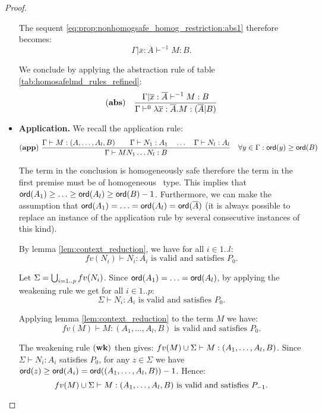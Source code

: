 \begin{proof}
\begin{itemize}
The sequent \ref{eq:prop:nonhomogsafe_homog_restriction:abs1} therefore becomes:
$$\Gamma | \overline{x} : \overline{A} \vdash^{-1} M : B.$$

We conclude by applying the abstraction rule of table
\ref{tab:homosafelmd_rules_refined}:
$$ \mathbf{(abs)} \quad  \frac{\displaystyle \Gamma| \overline{x} : \overline{A} \vdash^{-1} M : B}{\Gamma  \vdash^{0} \lambda \overline{x} : \overline{A} . M : (\overline{A}|B)}$$



\item \textbf{Application.} We recall the application rule:
$$ \mathbf{(app)} \  \frac{\displaystyle \Gamma \vdash M : (A,\ldots,A_l,B)
                                        \qquad \Gamma \vdash N_1 : A_1
                                        \quad \ldots \quad \Gamma \vdash N_l : A_l  }{\Gamma  \vdash M N_1 \ldots N_l : B}
                                    \quad
                                   \forall y \in \Gamma : {\sf ord}(y) \geq {\sf ord}(B)$$

The term in the conclusion is homogeneously safe therefore the term in the first premise must be of homogeneous \
type. This implies that ${\sf ord}(A_1) \geq \ldots \geq {\sf ord}(A_l)
\geq {\sf ord}(B) - 1$.
Furthermore, we can make the assumption that ${\sf ord}(A_1) = \ldots = {\sf ord}(A_l) = {\sf ord}(\overline{A})$
(it is always possible to replace an instance of the application rule
by several consecutive instances of this kind).

By lemma \ref{lem:context_reduction}, we have for all $i \in 1..l$:
$$fv(N_i) \vdash N_i : A_i \mbox{ is valid and satisfies } P_0.$$

Let $\Sigma = \bigcup_{i=1..p} fv(N_i)$. Since ${\sf ord}(A_1) = \ldots = {\sf ord}(A_l)$, by applying the weakening rule we get for all $i\in 1..p$:
$$\Sigma \vdash N_i : A_i \mbox{ is valid and satisfies } P_0.$$


Applying lemma \ref{lem:context_reduction} to the term $M$ we have:
$$fv(M) \vdash M : (A_1,\ldots,A_l,B) \mbox{ is valid and satisfies } P_0.$$

The weakening rule $\mathbf{(wk)}$ then gives:
$fv(M) \cup \Sigma \vdash M : (A_1,\ldots,A_l,B)$.
Since $\Sigma \vdash N_i : A_i$ satisfies $P_0$, for any
$z \in \Sigma$ we have ${\sf ord}(z) \geq {\sf ord}(A_i) = {\sf ord}((A_1,\ldots,A_l,B)) - 1$.
Hence:
\begin{equation}
fv(M) \cup \Sigma \vdash M : (A_1,\ldots,A_l,B) \mbox{ is valid
and satisfies } P_{-1}
\label{eq:prop:nonhomogsafe_homog_restriction:m}.
\end{equation}


\end{itemize}
\end{proof}
